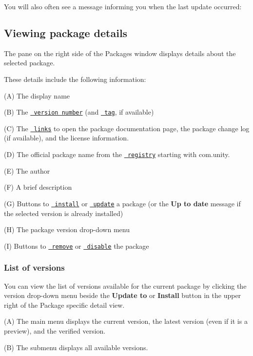 You will also often see a message informing you when the last update occurred\+:



\label{_PackManDetails}%
 \subsection*{Viewing package details}

The pane on the right side of the Packages window displays details about the selected package.



These details include the following information\+:
\begin{DoxyItemize}
\item (A) The display name
\item (B) The \href{\#VersionList}{\texttt{ version number}} (and \href{\#version_tags}{\texttt{ tag}}, if available)
\item (C) The \href{\#links}{\texttt{ links}} to open the package documentation page, the package change log (if available), and the license information.
\item (D) The official package name from the \href{\#PackManRegistry}{\texttt{ registry}} starting with {\ttfamily com.\+unity.}
\item (E) The author
\item (F) A brief description
\item (G) Buttons to \href{\#PackManInstall}{\texttt{ install}} or \href{\#PackManUpdate}{\texttt{ update}} a package (or the {\bfseries{Up to date}} message if the selected version is already installed)
\item (H) The package version drop-\/down menu
\item (I) Buttons to \href{\#PackManRemove}{\texttt{ remove}} or \href{\#PackManDisable}{\texttt{ disable}} the package
\end{DoxyItemize}

\label{_VersionList}%
 \subsubsection*{List of versions}

You can view the list of versions available for the current package by clicking the version drop-\/down menu beside the {\bfseries{Update to}} or {\bfseries{Install}} button in the upper right of the Package specific detail view.


\begin{DoxyItemize}
\item (A) The main menu displays the current version, the latest version (even if it is a preview), and the verified version.
\item (B) The submenu displays all available versions.
\end{DoxyItemize}

